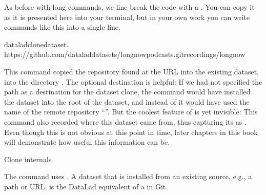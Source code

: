 \sphinxAtStartPar
As before with long commands, we line break the code with a \sphinxcode{\sphinxupquote{\textbackslash{}}}. You can
copy it as it is presented here into your terminal, but in your own work you
can write commands like this into a single line.

\begin{sphinxVerbatim}[commandchars=\\\{\}]
dataladclone\PYGZhy{}\PYGZhy{}dataset.
https://github.com/datalad\PYGZhy{}datasets/longnow\PYGZhy{}podcasts.gitrecordings/longnow
\end{sphinxVerbatim}

\sphinxAtStartPar
This command copied the repository found at the URL 
into the existing  dataset, into the directory .
The optional destination is helpful: If we had not specified the path
 as a destination for the dataset clone, the command would
have installed the dataset into the root of the  dataset, and instead
of  it would have used the name of the remote repository “”.
But the coolest feature of  is yet invisible: This command
also recorded where this dataset came from, thus capturing its  as
{\hyperref[\detokenize{glossary:term-provenance}]{}}. Even though this is not obvious at this point in time, later
chapters in this book will demonstrate how useful this information can be.

\ignorespaces \begin{gitusernote}[label={index-1}, before title={\thetcbcounter\ }, float, floatplacement=p, check odd page=true]{Clone internals}
\label{\detokenize{basics/101-105-install:index-1}}

\sphinxAtStartPar
The  command uses .
A dataset that is installed from an existing source, e.g., a path or URL,
is the DataLad equivalent of a  in Git.


\end{gitusernote}

